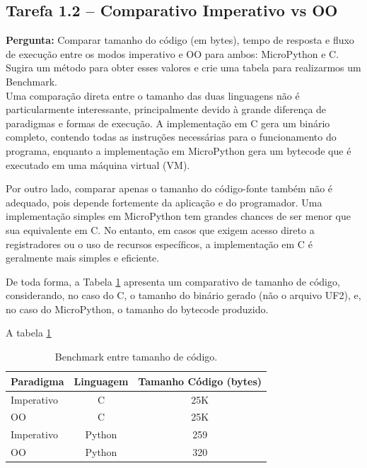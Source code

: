 \documentclass{article}
\begin{document}
\subsection{Tarefa 1.2 -- Comparativo Imperativo vs OO}
\textbf{Pergunta:} Comparar tamanho do código (em bytes), tempo de resposta e fluxo de execução entre os modos imperativo e OO para ambos: MicroPython e C. Sugira um método para obter esses valores e crie uma tabela para realizarmos um Benchmark.  \\

\noindent
Uma comparação direta entre o tamanho das duas linguagens não é particularmente interessante, principalmente devido à grande diferença de paradigmas e formas de execução. A implementação em C gera um binário completo, contendo todas as instruções necessárias para o funcionamento do programa, enquanto a implementação em MicroPython gera um bytecode que é executado em uma máquina virtual (VM).

Por outro lado, comparar apenas o tamanho do código-fonte também não é adequado, pois depende fortemente da aplicação e do programador. Uma implementação simples em MicroPython tem grandes chances de ser menor que sua equivalente em C. No entanto, em casos que exigem acesso direto a registradores ou o uso de recursos específicos, a implementação em C é geralmente mais simples e eficiente.

De toda forma, a Tabela \ref{tab:benchmark_oo} apresenta um comparativo de tamanho de código, considerando, no caso do C, o tamanho do binário gerado (não o arquivo UF2), e, no caso do MicroPython, o tamanho do bytecode produzido.

A tabela \ref{tab:benchmark_oo}

\begin{table}[H]
    \centering
    \label{tab:benchmark_oo}
    \begin{tabular}{lcc}
        \toprule
        Paradigma & Linguagem & Tamanho Código (bytes) \\
        \midrule
        Imperativo & C        & 25K  \\
        OO         & C        & 25K  \\
        Imperativo & Python   & 259  \\
        OO         & Python   & 320  \\
        \bottomrule
    \end{tabular}
    \caption{Benchmark entre tamanho de código.}
\end{table}
\end{document}

